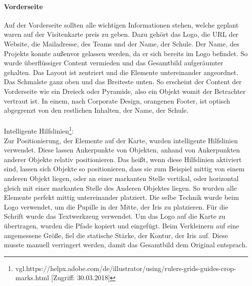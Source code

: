 \paragraph{Vorderseite}
Auf der Vorderseite sollten alle wichtigen Informationen stehen, welche geplant waren auf der Visitenkarte preis zu geben. Dazu gehört das Logo, die URL der Website, die Mailadresse, des Teams und der Name, der Schule. Der Name, des Projekts konnte außenvor gelassen werden, da er sich bereits im Logo befindet. So wurde überflüssiger Content vermieden und das Gesamtbild aufgeräumter gehalten. Das Layout ist zentriert und die Elemente untereinander angeordnet. Das Schmalste ganz oben und das Breiteste unten. So erscheint der Content der Vorderseite wie ein Dreieck oder Pyramide, also ein Objekt womit der Betrachter vertraut ist. In einem, nach Corporate Design, orangenen Footer, ist optisch abgegrenzt von den restlichen Inhalten, der Name, der Schule.
\leavevmode \\
\leavevmode \\
Intelligente Hilfslinien\footnote{\label{} vgl.https://helpx.adobe.com/de/illustrator/using/rulers-grids-guides-crop-marks.html [Zugriff: 30.03.2018]}: 
\leavevmode \\
Zur Positionierung, der Elemente auf der Karte, wurden intelligente Hilfslinien verwendet. Diese lassen Ankerpunkte von Objekten, anhand von Ankerpunkten anderer Objekte relativ positionieren. Das heißt, wenn diese Hilfslinien aktiviert sind, lassen sich Objekte so positionieren, dass sie zum Beispiel mittig von einem anderen Objekt liegen, oder an einer markanten Stelle vertikal, oder horizontal gleich mit einer markanten Stelle des Anderen Objektes liegen. So wurden alle Elemente perfekt mittig untereinander platziert. Die selbe Technik wurde beim Logo verwendet, um die Pupille in der Mitte, der Iris zu platzieren. Für die Schrift wurde das Textwerkzeug verwendet. Um das Logo auf die Karte zu übertragen, wurden die Pfade kopiert und eingefügt. Beim Verkleinern auf eine angemessene Größe, fiel die statische Stärke, der Kontur, der Iris auf. Diese musste manuell verringert werden, damit das Gesamtbild dem Original entsprach.

